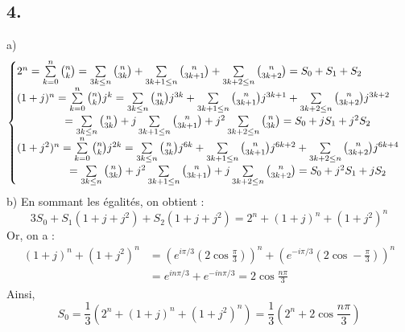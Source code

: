\documentclass[10pt]{article}
\begin{document}
\subsection*{4.}
\begin{tcolorbox}[enhanced, width=7in, center, size=fbox, fontupper=\large, drop shadow southwest]
    a)
    \begin{equation*}
        \begin{cases}
            2^n = \sum\limits_{k=0}^n{\binom{n}{k}}=\sum\limits_{3k \leq n}{\binom{n}{3k}}+\sum\limits_{3k+1 \leq n}{\binom{n}{3k+1}}+\sum\limits_{3k+2 \leq n}{\binom{n}{3k+2}}=S_0+S_1+S_2\\
            (1+j)^n = \sum\limits_{k=0}^n{\binom{n}{k}j^k}=\sum\limits_{3k \leq n}{\binom{n}{3k}j^{3k}} + \sum\limits_{3k+1 \leq n}{\binom{n}{3k+1}j^{3k+1}}+\sum\limits_{3k+2 \leq n}{\binom{n}{3k+2}j^{3k+2}}\\
            \hspace{1.55cm} = \sum\limits_{3k \leq n}{\binom{n}{3k}} + j\sum\limits_{3k+1 \leq n}{\binom{n}{3k+1}}+j^2\sum\limits_{3k+2 \leq n}{\binom{n}{3k}}=S_0 + jS_1 + j^2S_2\\
            (1+j^2)^n = \sum\limits_{k=0}^n{\binom{n}{k}j^{2k}}  = \sum\limits_{3k \leq n}{\binom{n}{3k}j^{6k}}+\sum\limits_{3k + 1 \leq n}{\binom{n}{3k+1}j^{6k+2}} + \sum\limits_{3k+2 \leq n}{\binom{n}{3k+2}j^{6k+4}}\\
            \hspace{1.7cm}= \sum\limits_{3k \leq n}{\binom{n}{3k}}+j^2\sum\limits_{3k+1 \leq n}{\binom{n}{3k+1}}+j\sum\limits_{3k+2 \leq n}{\binom{n}{3k+2}} = S_0 + j^2S_1 + jS_2
        \end{cases}
    \end{equation*}
    b) En sommant les égalités, on obtient :
    \begin{equation*}
        3S_0 + S_1(1 + j + j^2) + S_2(1 + j + j^2) = 2^n + (1 + j)^n + (1 + j^2)^n
    \end{equation*}
    Or, on a :
    \begin{align*}
        (1+j)^n+(1+j^2)^n &= (e^{i\pi/3}(2\cos\frac{\pi}{3}))^n + (e^{-i\pi/3}(2\cos-\frac{\pi}{3}))^n\\
        &= e^{in\pi/3} + e^{-in\pi/3} = 2\cos\frac{n\pi}{3}
    \end{align*} 
    Ainsi, 
    \begin{equation*}
        S_0 = \frac{1}{3}\left(2^n+(1+j)^n + (1+j^2)^n\right) = \frac{1}{3}\left(2^n + 2\cos\frac{n\pi}{3}\right)
    \end{equation*}
\end{tcolorbox}
\end{document}
